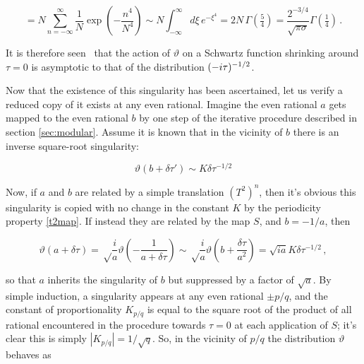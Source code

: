 \documentclass{article}
\newcommand{\intR}{\int_{-\infty}^\infty}
\newcommand{\sumZ}{\sum_{n=-\infty}^{\infty}}
\begin{document}
\begin{equation}
    = N \sumZ \frac{1}{N} \exp(-\frac{n^4}{N^4}) \sim N \intR d\xi \, e^{-\xi^4} = 2 N \, \Gamma(\tfrac{5}{4}) = \frac{2^{-3/4}}{\sqrt{\pi\sigma}} \Gamma(\tfrac{1}{4})\,.
\end{equation}

It is therefore seen%
\ that the action of $\vartheta$ on a Schwartz function shrinking around $\tau=0$ is asymptotic to that of the distribution $(-i\tau)^{-1/2}$.

Now that the existence of this singularity has been ascertained, let us verify a reduced copy of it exists at any even rational. Imagine the even rational $a$ gets mapped to the even rational $b$ by one step of the iterative procedure described in section \ref{sec:modular}. Assume it is known that in the vicinity of $b$ there is an inverse square-root singularity:

\begin{equation}
    \vartheta(b + \delta\tau') \sim K \delta \tau^{-1/2}
\end{equation}

Now, if $a$ and $b$ are related by a simple translation $(T^2)^n$, then it's obvious this singularity is copied with no change in the constant $K$ by the periodicity property \eqref{t2map}. If instead they are related by the map $S$, and $b = -1/a$, then

\begin{equation}
    \vartheta(a + \delta\tau) = \sqrt\frac{i}{a} \vartheta\left(-\frac{1}{a+\delta\tau}\right) \sim \sqrt\frac{i}{a} \vartheta(b + \frac{\delta \tau}{a^2}) = \sqrt{ia} K \delta\tau^{-1/2}\,,
\end{equation}

so that $a$ inherits the singularity of $b$ but suppressed by a factor of $\sqrt{a}$. By simple induction, a singularity appears at any even rational $\pm p/q$, and the constant of proportionality $K_{p/q}$ is equal to the square root of the product of all rational encountered in the procedure towards $\tau = 0$ at each application of $S$; it's clear this is simply $|K_{p/q}| = 1/\sqrt{q}$. So, in the vicinity of $p/q$ the distribution $\vartheta$ behaves as
\end{document}
